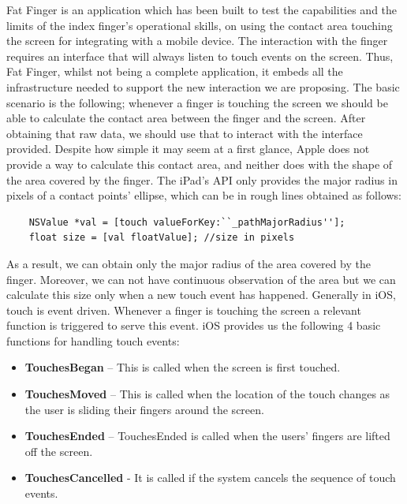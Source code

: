 Fat Finger is an application which has been built to test the capabilities and the limits of the index finger's operational skills, on using the contact area touching the screen for integrating with a mobile device. The interaction with the finger requires an interface that will always listen to touch events on the screen. Thus, Fat Finger, whilst not being a complete application, it embeds all the infrastructure needed to support the new interaction we are proposing. The basic scenario is the following; whenever a finger is touching the screen we should be able to calculate the contact area between the finger and the screen. After obtaining that raw data, we should use that to interact with the interface provided. Despite how simple it may seem at a first glance, Apple does not provide a way to calculate this contact area, and neither does with the shape of the area covered by the finger. The iPad’s API only provides the major radius in pixels of a contact points' ellipse, which can be in rough lines obtained as follows:



\begin{lstlisting}
	NSValue *val = [touch valueForKey:``_pathMajorRadius''];
 	float size = [val floatValue]; //size in pixels
\end{lstlisting}


As a result, we can obtain only the major radius of the area covered by the finger. Moreover, we can not have continuous observation of the area but we can calculate this size only when a new touch event has happened. Generally in iOS, touch is event driven. Whenever a finger is touching the screen a relevant function is triggered to serve this event. iOS provides us the following 4 basic functions for handling touch events:

\begin{itemize}
	\item \textbf{TouchesBegan} – This is called when the screen is first touched.

	\item \textbf{TouchesMoved} – This is called when the location of the touch changes as the user is sliding their fingers around the screen.

	\item \textbf{TouchesEnded} – TouchesEnded is called when the users' fingers are lifted off the screen. 

	\item \textbf{TouchesCancelled} - It is called if the system cancels the sequence of touch events.
\end{itemize}	
	
